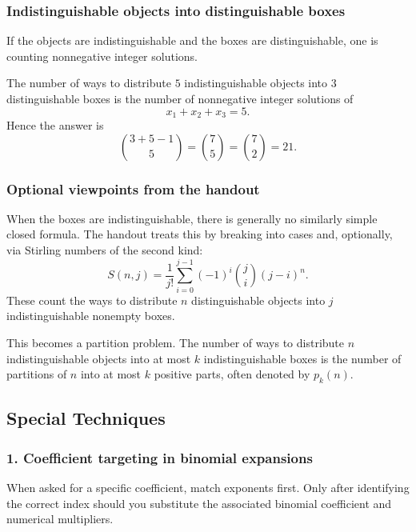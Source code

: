 \subsubsection{Indistinguishable objects into distinguishable boxes}

If the objects are indistinguishable and the boxes are distinguishable, one is counting nonnegative integer solutions.

\begin{examplebox}[title={Five indistinguishable objects into three distinguishable boxes}]
The number of ways to distribute $5$ indistinguishable objects into $3$ distinguishable boxes is the number of nonnegative integer solutions of
\[
x_1+x_2+x_3=5.
\]
Hence the answer is
\[
\binom{3+5-1}{5}=\binom{7}{5}=\binom{7}{2}=21.
\]
\end{examplebox}

\subsubsection{Optional viewpoints from the handout}

\begin{extension}[title={Distinguishable objects into indistinguishable boxes}]
When the boxes are indistinguishable, there is generally no similarly simple closed formula. The handout treats this by breaking into cases and, optionally, via Stirling numbers of the second kind:
\[
S(n,j)=\frac{1}{j!}\sum_{i=0}^{j-1}(-1)^i\binom{j}{i}(j-i)^n.
\]
These count the ways to distribute $n$ distinguishable objects into $j$ indistinguishable nonempty boxes.
\end{extension}

\begin{extension}[title={Indistinguishable objects into indistinguishable boxes}]
This becomes a partition problem. The number of ways to distribute $n$ indistinguishable objects into at most $k$ indistinguishable boxes is the number of partitions of $n$ into at most $k$ positive parts, often denoted by $p_k(n)$.
\end{extension}

\subsection{Special Techniques}

\subsubsection*{1. Coefficient targeting in binomial expansions}
When asked for a specific coefficient, match exponents first. Only after identifying the correct index should you substitute the associated binomial coefficient and numerical multipliers.

